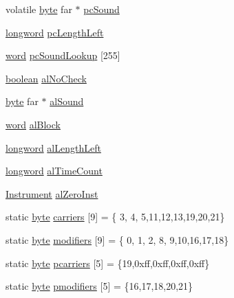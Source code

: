 \begin{DoxyCompactItemize}
\item 
volatile \hyperlink{ID__HEAD_8H_a0c8186d9b9b7880309c27230bbb5e69d}{byte} far $\ast$ \hyperlink{ID__SD_8C_af79ef9eaf2fc8ba85f289bd19e36a6c5}{pcSound}
\item 
\hyperlink{ID__HEAD_8H_a8a9a7dd50c6fdb45dcdf0eb929479663}{longword} \hyperlink{ID__SD_8C_af057ee8e6effd1195904b1b8be9412f3}{pcLengthLeft}
\item 
\hyperlink{ID__HEAD_8H_abad51e07ab6d26bec9f1f786c8d65bcd}{word} \hyperlink{ID__SD_8C_ae415b11bd2fb7f86edc88c0525faeeaf}{pcSoundLookup} \mbox{[}255\mbox{]}
\item 
\hyperlink{ID__HEAD_8H_a7c6368b321bd9acd0149b030bb8275ed}{boolean} \hyperlink{ID__SD_8C_a4a1e51753cfe2aea51d99cffbcd8eb80}{alNoCheck}
\item 
\hyperlink{ID__HEAD_8H_a0c8186d9b9b7880309c27230bbb5e69d}{byte} far $\ast$ \hyperlink{ID__SD_8C_abb64954289074edec51f58bb5a122760}{alSound}
\item 
\hyperlink{ID__HEAD_8H_abad51e07ab6d26bec9f1f786c8d65bcd}{word} \hyperlink{ID__SD_8C_a9e81fc8ee3c094431e403b518cbf1875}{alBlock}
\item 
\hyperlink{ID__HEAD_8H_a8a9a7dd50c6fdb45dcdf0eb929479663}{longword} \hyperlink{ID__SD_8C_a00615a954b103b34a8699929b7311d1c}{alLengthLeft}
\item 
\hyperlink{ID__HEAD_8H_a8a9a7dd50c6fdb45dcdf0eb929479663}{longword} \hyperlink{ID__SD_8C_a4d4a035e1ebf79e5bac7b8d0bdef1a98}{alTimeCount}
\item 
\hyperlink{structInstrument}{Instrument} \hyperlink{ID__SD_8C_a5f76467e381fc23aed5465e3d65e8a91}{alZeroInst}
\item 
static \hyperlink{ID__HEAD_8H_a0c8186d9b9b7880309c27230bbb5e69d}{byte} \hyperlink{ID__SD_8C_a63f30f1ee0d7dfe2b7b22427ed4592ac}{carriers} \mbox{[}9\mbox{]} = \{ 3, 4, 5,11,12,13,19,20,21\}
\item 
static \hyperlink{ID__HEAD_8H_a0c8186d9b9b7880309c27230bbb5e69d}{byte} \hyperlink{ID__SD_8C_ab3ab25119a78988873ef0142305bd2b9}{modifiers} \mbox{[}9\mbox{]} = \{ 0, 1, 2, 8, 9,10,16,17,18\}
\item 
static \hyperlink{ID__HEAD_8H_a0c8186d9b9b7880309c27230bbb5e69d}{byte} \hyperlink{ID__SD_8C_abbe10755880e6acbb43dbc7a5709a3de}{pcarriers} \mbox{[}5\mbox{]} = \{19,0xff,0xff,0xff,0xff\}
\item 
static \hyperlink{ID__HEAD_8H_a0c8186d9b9b7880309c27230bbb5e69d}{byte} \hyperlink{ID__SD_8C_a54b15c4feacf6f7b5754eb7c1a995870}{pmodifiers} \mbox{[}5\mbox{]} = \{16,17,18,20,21\}
\item 

\end{DoxyCompactItemize}
